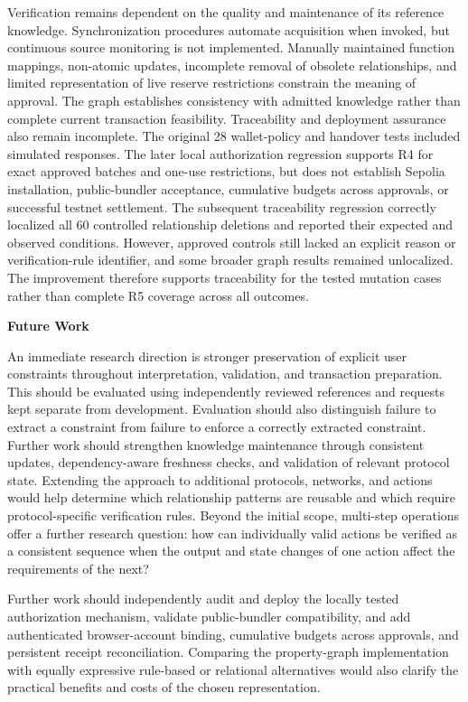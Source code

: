 Verification remains dependent on the quality and maintenance of its
reference knowledge. Synchronization procedures automate acquisition
when invoked, but continuous source monitoring is not implemented.
Manually maintained function mappings, non-atomic updates, incomplete
removal of obsolete relationships, and limited representation of live
reserve restrictions constrain the meaning of approval. The graph
establishes consistency with admitted knowledge rather than complete
current transaction feasibility. Traceability and deployment assurance
also remain incomplete. The original 28 wallet-policy and handover tests
included simulated responses. The later local authorization regression
supports R4 for exact approved batches and one-use restrictions, but does
not establish Sepolia installation, public-bundler acceptance, cumulative
budgets across approvals, or successful testnet settlement.
The subsequent traceability regression correctly localized all 60
controlled relationship deletions and reported their expected and
observed conditions. However, approved controls still lacked an explicit
reason or verification-rule identifier, and some broader graph results
remained unlocalized. The improvement therefore supports traceability
for the tested mutation cases rather than complete R5 coverage across
all outcomes.

\medskip
\noindent\textbf{Future Work}

An immediate research direction is stronger preservation of explicit
user constraints throughout interpretation, validation, and transaction
preparation. This should be evaluated using independently reviewed
references and requests kept separate from development. Evaluation
should also distinguish failure to extract a constraint from failure
to enforce a correctly extracted constraint. Further work should strengthen knowledge maintenance through consistent
updates, dependency-aware freshness checks, and validation of relevant
protocol state. Extending the approach to additional protocols,
networks, and actions would help determine which relationship patterns
are reusable and which require protocol-specific verification rules.
Beyond the initial scope, multi-step operations offer a further research
question: how can individually valid actions be verified as a consistent
sequence when the output and state changes of one action affect the
requirements of the next?

Further work should independently audit and deploy the locally tested
authorization mechanism, validate public-bundler compatibility, and add
authenticated browser-account binding, cumulative budgets across approvals,
and persistent receipt reconciliation.
Comparing the property-graph implementation with equally expressive
rule-based or relational alternatives would also clarify the practical
benefits and costs of the chosen representation.

